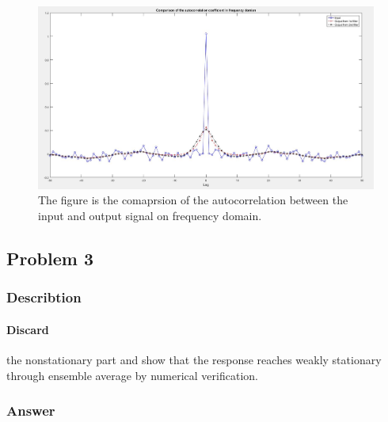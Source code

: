 \documentclass[12pt,a4paper]{article}
\begin{document}
			\begin{figure}[H]
				\centering
				\includegraphics[scale=0.4]{Problem2k}
				\caption[Comparsion of the autocorrelation between the input and output signal on frequency doiman separately]{The figure is the comaprsion of the autocorrelation between the input and output signal on frequency domain.}
			\end{figure}
		\subsection{Problem 3}
			\subsubsection{Describtion}
				\paragraph{Discard} the nonstationary part and show that the response reaches weakly stationary through ensemble average by numerical verification. 
			\subsubsection{Answer}
\end{document}
